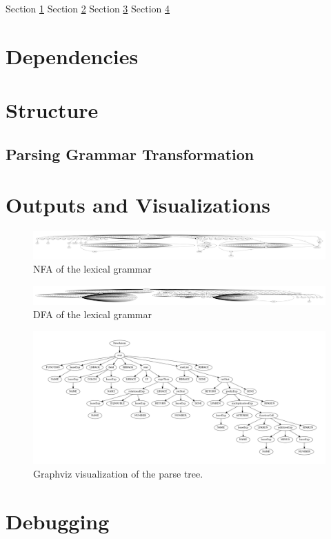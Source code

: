 Section \ref{dependancies}
\newline \newline
Section \ref{structure}
\newline \newline
Section \ref{outputs_and_visualizations}
\newline \newline
Section \ref{debugging}

\section{Dependencies} \label{dependancies}
\section{Structure} \label{structure}
\subsection{Parsing Grammar Transformation} \label{parsing_grammar_transformation}
\section{Outputs and Visualizations} \label{outputs_and_visualizations}

\begin{figure}[t]
\includegraphics[width=\linewidth]{images/nfa.png}
\caption{NFA of the lexical grammar}
\label{fig:nfa}
\end{figure}

\begin{figure}[t]
\includegraphics[width=\linewidth]{images/dfa.png}
\caption{DFA of the lexical grammar}
\label{fig:dfa}
\end{figure}

\begin{figure}[t]
\includegraphics[width=\linewidth]{images/ptree.png}
\caption{Graphviz visualization of the parse tree.}
\label{fig:parse_tree}
\end{figure}

\section{Debugging} \label{debugging}
